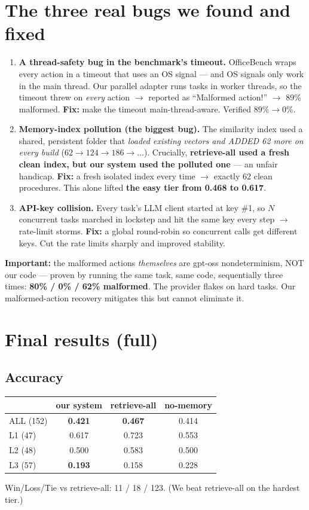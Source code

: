 \documentclass[11pt]{article}
\begin{document}
\section{The three real bugs we found and fixed}
\begin{enumerate}[leftmargin=1.5em,itemsep=3pt]
\item \textbf{A thread-safety bug in the benchmark's timeout.} OfficeBench wraps every action in a
timeout that uses an OS signal --- and OS signals only work in the main thread. Our parallel adapter runs
tasks in worker threads, so the timeout threw on \emph{every} action $\to$ reported as ``Malformed
action!'' $\to$ 89\% malformed. \textbf{Fix:} make the timeout main-thread-aware. Verified $89\% \to 0\%$.
\item \textbf{Memory-index pollution (the biggest bug).} The similarity index used a shared, persistent
folder that \emph{loaded existing vectors and ADDED 62 more on every build} ($62\to124\to186\to\ldots$).
Crucially, \textbf{retrieve-all used a fresh clean index, but our system used the polluted one} --- an
unfair handicap. \textbf{Fix:} a fresh isolated index every time $\to$ exactly 62 clean procedures. This
alone lifted \textbf{the easy tier from 0.468 to 0.617}.
\item \textbf{API-key collision.} Every task's LLM client started at key \#1, so $N$ concurrent tasks
marched in lockstep and hit the same key every step $\to$ rate-limit storms. \textbf{Fix:} a global
round-robin so concurrent calls get different keys. Cut the rate limits sharply and improved stability.
\end{enumerate}
\textbf{Important:} the malformed actions \emph{themselves} are gpt-oss nondeterminism, NOT our code ---
proven by running the same task, same code, sequentially three times: \textbf{80\% / 0\% / 62\%
malformed}. The provider flakes on hard tasks. Our malformed-action recovery mitigates this but cannot
eliminate it.

\section{Final results (full)}
\subsection{Accuracy}
\begin{center}
\begin{tabular}{@{}lccc@{}}
\toprule
 & our system & retrieve-all & no-memory \\
\midrule
ALL (152) & \textbf{0.421} & \textbf{0.467} & 0.414 \\
L1 (47)   & 0.617 & 0.723 & 0.553 \\
L2 (48)   & 0.500 & 0.583 & 0.500 \\
L3 (57)   & \textbf{0.193} & 0.158 & 0.228 \\
\bottomrule
\end{tabular}
\end{center}
Win/Loss/Tie vs retrieve-all: 11 / 18 / 123. (We beat retrieve-all on the hardest tier.)
\end{document}
